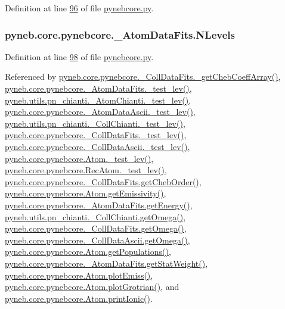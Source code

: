 Definition at line \hyperlink{pynebcore_8py_source_l00096}{96} of file \hyperlink{pynebcore_8py_source}{pynebcore.\-py}.

\hypertarget{classpyneb_1_1core_1_1pynebcore_1_1___atom_data_fits_a85c3a2d0c1cdbecc851be17237caff63}{
\subsubsection[{N\-Levels}]{\setlength{\rightskip}{0pt plus 5cm}pyneb.\-core.\-pynebcore.\-\_\-\-Atom\-Data\-Fits.\-N\-Levels}}\label{classpyneb_1_1core_1_1pynebcore_1_1___atom_data_fits_a85c3a2d0c1cdbecc851be17237caff63}


Definition at line \hyperlink{pynebcore_8py_source_l00098}{98} of file \hyperlink{pynebcore_8py_source}{pynebcore.\-py}.



Referenced by \hyperlink{pynebcore_8py_source_l00751}{pyneb.\-core.\-pynebcore.\-\_\-\-Coll\-Data\-Fits.\-\_\-get\-Cheb\-Coeff\-Array()}, \hyperlink{pynebcore_8py_source_l00178}{pyneb.\-core.\-pynebcore.\-\_\-\-Atom\-Data\-Fits.\-\_\-test\-\_\-lev()}, \hyperlink{pn__chianti_8py_source_l00304}{pyneb.\-utils.\-pn\-\_\-chianti.\-\_\-\-Atom\-Chianti.\-\_\-test\-\_\-lev()}, \hyperlink{pynebcore_8py_source_l00447}{pyneb.\-core.\-pynebcore.\-\_\-\-Atom\-Data\-Ascii.\-\_\-test\-\_\-lev()}, \hyperlink{pn__chianti_8py_source_l00472}{pyneb.\-utils.\-pn\-\_\-chianti.\-\_\-\-Coll\-Chianti.\-\_\-test\-\_\-lev()}, \hyperlink{pynebcore_8py_source_l00677}{pyneb.\-core.\-pynebcore.\-\_\-\-Coll\-Data\-Fits.\-\_\-test\-\_\-lev()}, \hyperlink{pynebcore_8py_source_l01045}{pyneb.\-core.\-pynebcore.\-\_\-\-Coll\-Data\-Ascii.\-\_\-test\-\_\-lev()}, \hyperlink{pynebcore_8py_source_l01525}{pyneb.\-core.\-pynebcore.\-Atom.\-\_\-test\-\_\-lev()}, \hyperlink{pynebcore_8py_source_l02672}{pyneb.\-core.\-pynebcore.\-Rec\-Atom.\-\_\-test\-\_\-lev()}, \hyperlink{pynebcore_8py_source_l00711}{pyneb.\-core.\-pynebcore.\-\_\-\-Coll\-Data\-Fits.\-get\-Cheb\-Order()}, \hyperlink{pynebcore_8py_source_l01782}{pyneb.\-core.\-pynebcore.\-Atom.\-get\-Emissivity()}, \hyperlink{pynebcore_8py_source_l00275}{pyneb.\-core.\-pynebcore.\-\_\-\-Atom\-Data\-Fits.\-get\-Energy()}, \hyperlink{pn__chianti_8py_source_l00507}{pyneb.\-utils.\-pn\-\_\-chianti.\-\_\-\-Coll\-Chianti.\-get\-Omega()}, \hyperlink{pynebcore_8py_source_l00828}{pyneb.\-core.\-pynebcore.\-\_\-\-Coll\-Data\-Fits.\-get\-Omega()}, \hyperlink{pynebcore_8py_source_l01082}{pyneb.\-core.\-pynebcore.\-\_\-\-Coll\-Data\-Ascii.\-get\-Omega()}, \hyperlink{pynebcore_8py_source_l01562}{pyneb.\-core.\-pynebcore.\-Atom.\-get\-Populations()}, \hyperlink{pynebcore_8py_source_l00249}{pyneb.\-core.\-pynebcore.\-\_\-\-Atom\-Data\-Fits.\-get\-Stat\-Weight()}, \hyperlink{pynebcore_8py_source_l02384}{pyneb.\-core.\-pynebcore.\-Atom.\-plot\-Emiss()}, \hyperlink{pynebcore_8py_source_l02443}{pyneb.\-core.\-pynebcore.\-Atom.\-plot\-Grotrian()}, and \hyperlink{pynebcore_8py_source_l02233}{pyneb.\-core.\-pynebcore.\-Atom.\-print\-Ionic()}.

